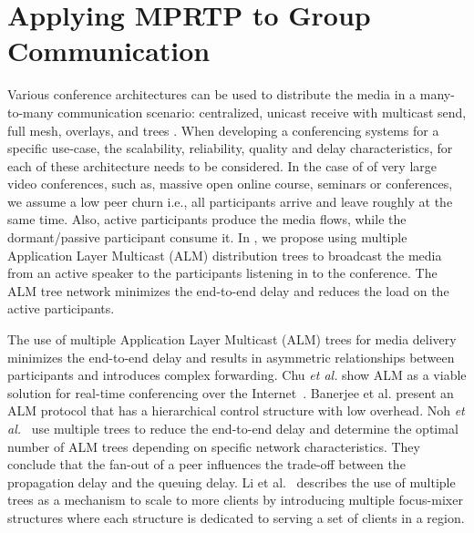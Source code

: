 
\section{Applying MPRTP to Group Communication}


Various conference architectures can be used to distribute the media in a
many-to-many communication scenario: centralized, unicast receive with
multicast send, full mesh, overlays, and trees
\cite{Li2010a,Noh2008,Singh2001}. When developing a conferencing systems for a
specific use-case, the scalability, reliability, quality and delay
characteristics, for each of these architecture needs to be considered. In the
case of of very large video conferences, such as, massive open online course,
seminars or conferences, we assume a low peer churn i.e., all participants
arrive and leave roughly at the same time. Also, active participants produce
the media flows, while the dormant/passive participant consume it. In
\cite{Globisch:AsymGrpComm}, we propose using multiple Application Layer
Multicast (ALM) distribution trees to broadcast the media from an active
speaker to the participants listening in to the conference. The ALM tree
network minimizes the end-to-end delay and reduces the load on the active
participants.

The use of multiple Application Layer Multicast (ALM) trees for media delivery
minimizes the end-to-end delay and results in asymmetric relationships between
participants and introduces complex forwarding. Chu \emph{et al.} show ALM as
a viable solution for real-time conferencing over the Internet~\cite{Chu2001}.
Banerjee et al.\cite{Banerjee2002} present an ALM protocol that has a
hierarchical control structure with low overhead. Noh \emph{et
al.}~\cite{Noh2008} use multiple trees to reduce the end-to-end delay and
determine the optimal number of ALM trees depending on specific network
characteristics. They conclude that the fan-out of a peer influences the
trade-off between the propagation delay and the queuing delay. Li et
al.~\cite{Li2010a} describes the use of multiple trees as a mechanism to scale
to more clients by introducing multiple focus-mixer structures where each
structure is dedicated to serving a set of clients in a region.

